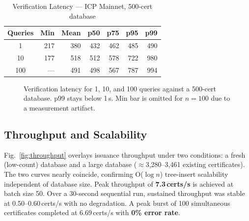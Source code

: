 \documentclass[conference]{IEEEtran}
\begin{document}
\begin{table}[t]
\caption{Verification Latency --- ICP Mainnet, 500-cert database}
\label{tab:verif}
\centering\small\renewcommand{\arraystretch}{1.1}
\begin{tabular}{@{}crrrrrr@{}}
\toprule
\textbf{Queries} & \textbf{Min} & \textbf{Mean} & \textbf{p50} & \textbf{p75} & \textbf{p95} & \textbf{p99} \\
\midrule
1   & 217 & 380 & 432 & 462 & 485 & 490 \\
10  & 177 & 518 & 512 & 578 & 722 & 980 \\
100 & {---} & 491 & 498 & 567 & 787 & 994 \\
\bottomrule
\end{tabular}
\end{table}

\begin{figure}[t]
\centering
{}
\caption{Verification latency for 1, 10, and 100 queries against a 500-cert database. p99 stays below 1\,s. Min bar is omitted for $n{=}100$ due to a measurement artifact.}
\label{fig:verif_perc}
\end{figure}

\subsection{Throughput and Scalability}
Fig.~\ref{fig:throughput} overlays issuance throughput under two conditions: a fresh (low-count) database and a large database ($\approx$3,280--3,461 existing certificates). The two curves nearly coincide, confirming O($\log n$) tree-insert scalability independent of database size. Peak throughput of \textbf{7.3\,certs/s} is achieved at batch size 50. Over a 30-second sequential run, sustained throughput was stable at 0.50--0.60\,certs/s with no degradation. A peak burst of 100 simultaneous certificates completed at 6.69\,certs/s with \textbf{0\% error rate}.
\end{document}
